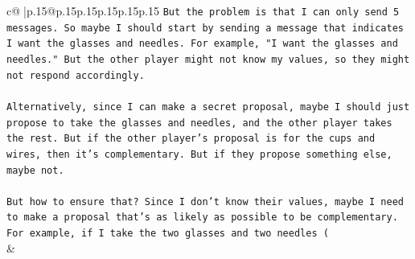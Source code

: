 \documentclass{article}
\begin{document}
{\begin{supertabular}{c@{$\;$}|p{.15\linewidth}@{}p{.15\linewidth}p{.15\linewidth}p{.15\linewidth}p{.15\linewidth}p{.15\linewidth}}
{{{\texttt{But the problem is that I can only send 5 messages. So maybe I should start by sending a message that indicates I want the glasses and needles. For example, "I want the glasses and needles." But the other player might not know my values, so they might not respond accordingly.} \\
\\ 
\texttt{Alternatively, since I can make a secret proposal, maybe I should just propose to take the glasses and needles, and the other player takes the rest. But if the other player's proposal is for the cups and wires, then it's complementary. But if they propose something else, maybe not.} \\
\\ 
\texttt{But how to ensure that? Since I don't know their values, maybe I need to make a proposal that's as likely as possible to be complementary. For example, if I take the two glasses and two needles (} \\
            }
        }
    }
    & \\ \\


\end{supertabular}}
\end{document}
